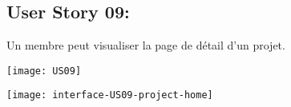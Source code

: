 \newpage{}
\subsection{User Story 09:}
Un membre peut visualiser la page de détail d'un projet.

  \begin{center}
        \texttt{[image: US09]}
  \end{center}

  \begin{center}
        \texttt{[image: interface-US09-project-home]}
  \end{center}